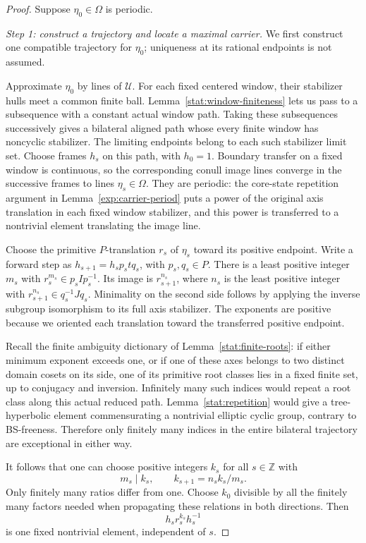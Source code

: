 \begin{proof}
Suppose $\eta_0\in\Omega$ is periodic.

\smallskip\noindent
\emph{Step 1: construct a trajectory and locate a maximal carrier.}
We first construct one compatible trajectory for $\eta_0$; uniqueness
at its rational endpoints is not assumed.

Approximate $\eta_0$ by lines of $\mathcal U$. For each fixed
centered window, their stabilizer hulls meet a common finite ball.
Lemma~\ref{stat:window-finiteness} lets us pass to a subsequence
with a constant actual window path. Taking these subsequences
successively gives a bilateral aligned path whose every finite
window has noncyclic stabilizer. The limiting endpoints belong to
each such stabilizer limit set. Choose frames $h_s$ on this path,
with $h_0=1$. Boundary transfer on a fixed window is continuous, so
the corresponding conull image lines converge in the successive
frames to lines $\eta_s\in\Omega$. They are periodic: the
core-state repetition argument in Lemma~\ref{exp:carrier-period}
puts a power of the original
axis translation in each fixed window stabilizer, and this power
is transferred to a nontrivial element translating the image line.

Choose the primitive $P$-translation $r_s$ of $\eta_s$ toward its
positive endpoint. Write a forward step as
$h_{s+1}=h_s p_s t q_s$, with $p_s,q_s\in P$.
There is a least positive integer $m_s$ with
$r_s^{m_s}\in p_sIp_s^{-1}$. Its image is
$r_{s+1}^{n_s}$, where $n_s$ is the least positive integer with
$r_{s+1}^{n_s}\in q_s^{-1}Jq_s$. Minimality on the second side
follows by applying the inverse subgroup isomorphism to its full
axis stabilizer. The exponents are positive because we oriented
each translation toward the transferred positive endpoint.

Recall the finite ambiguity dictionary of
Lemma~\ref{stat:finite-roots}: if either minimum exponent exceeds
one, or if one of
these axes belongs to two distinct domain cosets on its side,
one of its primitive root classes lies in a fixed finite set, up
to conjugacy and inversion. Infinitely many such indices would
repeat a root class along this actual reduced path.
Lemma~\ref{stat:repetition} would give a tree-hyperbolic element
commensurating a nontrivial elliptic cyclic group, contrary to
BS-freeness. Therefore only finitely many indices in the entire
bilateral trajectory are exceptional in either way.

It follows that one can choose positive integers $k_s$ for all
$s\in\mathbb Z$ with
\begin{equation}
 m_s\mid k_s,\qquad k_{s+1}=n_s k_s/m_s.
 \label{exp:resident-exponents}
\end{equation}
Only finitely many ratios differ from one. Choose $k_0$ divisible
by all the finitely many factors needed when propagating these
relations in both directions. Then
\[
 h_s r_s^{k_s}h_s^{-1}
\]
is one fixed nontrivial element, independent of $s$.


\end{proof}
